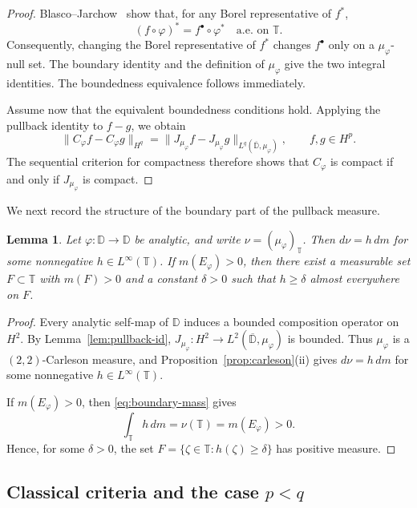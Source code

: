 \documentclass[10pt,a4paper]{amsart}
\newtheorem{lemma}[theorem]{Lemma}
\newcommand{\D}{\mathbb{D}}
\newcommand{\T}{\mathbb{T}}
\begin{document}
\begin{proof}
Blasco--Jarchow~\cite[Section~1]{BlascoJarchow2005} show that, for any
Borel representative of \(f^*\),
\[
        (f\circ\varphi)^*
        =
        f^\bullet\circ\varphi^*
        \quad\text{a.e. on }\T.
\]
Consequently, changing the Borel representative of \(f^*\) changes
\(f^\bullet\) only on a \(\mu_\varphi\)-null set. The boundary identity
and the definition of \(\mu_\varphi\) give the two integral identities.
The boundedness equivalence follows immediately.

Assume now that the equivalent boundedness conditions hold. Applying
the pullback identity to \(f-g\), we obtain
\[
        \|C_\varphi f-C_\varphi g\|_{H^q}
        =
        \|J_{\mu_\varphi}f-J_{\mu_\varphi}g\|
        _{L^q(\overline{\D},\mu_\varphi)},
        \qquad
        f,g\in H^p.
\]
The sequential criterion for compactness therefore shows that
\(C_\varphi\) is compact if and only if \(J_{\mu_\varphi}\) is compact.
\end{proof}


We next record the structure of the boundary part of the pullback
measure.

\begin{lemma}
\label{lem:boundary-part}
Let \(\varphi:\D\to\D\) be analytic, and write
\(\nu=(\mu_\varphi)_{\T}\). Then \(d\nu=h\,dm\) for some
nonnegative \(h\in L^\infty(\T)\). If \(m(E_\varphi)>0\), then there
exist a measurable set \(F\subset\T\) with \(m(F)>0\) and a constant
\(\delta>0\) such that \(h\ge\delta\) almost everywhere on \(F\).
\end{lemma}

\begin{proof}
Every analytic self-map of \(\D\) induces a bounded composition
operator on \(H^2\). By Lemma~\ref{lem:pullback-id},
\(J_{\mu_\varphi}:H^2\to L^2(\overline{\D},\mu_\varphi)\) is bounded.
Thus \(\mu_\varphi\) is a \((2,2)\)-Carleson measure, and
Proposition~\ref{prop:carleson}\textup{(ii)} gives
\(d\nu=h\,dm\) for some nonnegative \(h\in L^\infty(\T)\).

If \(m(E_\varphi)>0\), then
\eqref{eq:boundary-mass} gives
\[
        \int_{\T} h\,dm
        =
        \nu(\T)
        =
        m(E_\varphi)
        >
        0.
\]
Hence, for some \(\delta>0\), the set
\(F=\{\zeta\in\T:h(\zeta)\ge\delta\}\) has positive measure.
\end{proof}

\subsection{Classical criteria and the case
\texorpdfstring{\(p<q\)}{p<q}}
\label{subsec:smoothing}
\end{document}
